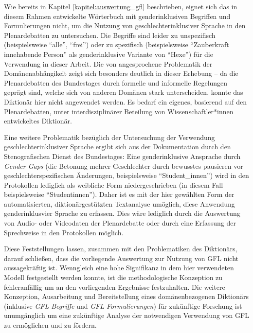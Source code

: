 \documentclass[12pt, 
    twoside=false, 
    bibliography=totoc, 
    numbers=endperiod, 
    headings=normal, 
    toc=chapterentrydotfill
    ]{scrbook}
\begin{document}
Wie bereits in Kapitel \ref{kapitel:auswertung_gfl} beschrieben, eignet sich das in diesem Rahmen entwickelte Wörterbuch mit genderinklusiven Begriffen und Formulierungen nicht, um die Nutzung von geschlechterinklusiver Sprache in den Plenardebatten zu untersuchen. Die Begriffe sind leider zu unspezifisch (beispielsweise \enquote{alle}, \enquote{frei}) oder zu spezifisch (beispielsweise \enquote{Zauberkraft innehabende Person} als genderinklusive Variante von \enquote{Hexe}) für die Verwendung in dieser Arbeit. Die von \textcite[2626]{haselmayer_2017} angesprochene Problematik der Domänenabhängikeit zeigt sich besonders deutlich in dieser Erhebung -- da die Plenardebatten des Bundestages durch formelle und informelle Regelungen geprägt sind, welche sich von anderen Domänen stark unterscheiden, konnte das Diktionär hier nicht angewendet werden. Es bedarf ein eigenes, basierend auf den Plenardebatten, unter interdisziplinärer Beteilung von Wissenschaftler*innen entwickeltes Diktionär.

Eine weitere Problematik bezüglich der Untersuchung der Verwendung geschlechterinklusiver Sprache ergibt sich aus der Dokumentation durch den Stenografischen Dienst des Bundestages: Eine genderinklusive Ansprache durch \emph{Gender Gaps} (die Betonung mehrer Geschlechter durch bewusstes pausieren vor geschlechterspezifischen Änderungen, beispielsweise \enquote{Student\_innen}) wird in den Protokollen lediglich als weibliche Form niedergeschrieben (in diesem Fall beispielsweise \enquote{Studentinnen}). Daher ist es mit der hier gewählten Form der automatisierten, diktionärgestützten Textanalyse umöglich, diese Anwendung genderinklusvier Sprache zu erfassen.
Dies wäre lediglich durch die Auswertung von Audio- oder Videodaten der Plenardebatte oder durch eine Erfassung der Sprechweise in den Protokollen möglich.

Diese Feststellungen lassen, zusammen mit den Problematiken des Diktionärs, darauf schließen, dass die vorliegende Auswertung zur Nutzung von GFL nicht aussagekräftig ist. Wenngleich eine hohe Signifikanz in dem hier verwendeten Modell festgestellt werden konnte, ist die methodologische Konzeption zu fehleranfällig um an den vorliegenden Ergebnisse festzuhalten. Die weitere Konzeption, Ausarbeitung und Bereitstellung eines domänenbezogenen Diktionärs (inklusive \emph{GFL-Begriffe} und \emph{GFL-Formulierungen}) für zukünftige Forschung ist unumgänglich um eine zukünftige Analyse der notwendigen Verwendung von GFL zu ermöglichen und zu fördern.
\end{document}
